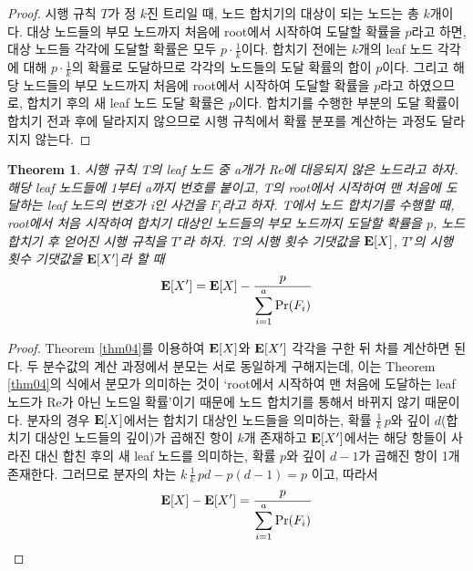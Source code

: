 \documentclass[11pt]{article}
\newtheorem{theorem}{Theorem}
\begin{document}
\begin{proof}
시행 규칙 $T$가 정 $k$진 트리일 때, 노드 합치기의 대상이 되는 노드는 총 $k$개이다. 대상 노드들의 부모 노드까지 처음에 root에서 시작하여 도달할 확률을 $p$라고 하면, 대상 노드들 각각에 도달할 확률은 모두 $p\cdot\frac{1}{k}$이다. 합치기 전에는 $k$개의 leaf 노드 각각에 대해 $p\cdot\frac{1}{k}$의 확률로 도달하므로 각각의 노드들의 도달 확률의 합이 $p$이다. 그리고 해당 노드들의 부모 노드까지 처음에 root에서 시작하여 도달할 확률을 $p$라고 하였으므로, 합치기 후의 새 leaf 노드 도달 확률은 $p$이다. 합치기를 수행한 부분의 도달 확률이 합치기 전과 후에 달라지지 않으므로 시행 규칙에서 확률 분포를 계산하는 과정도 달라지지 않는다.
\end{proof}

\singlespacing
\begin{theorem}
시행 규칙 T의 leaf 노드 중 a개가 Re에 대응되지 않은 노드라고 하자. 해당 leaf 노드들에 1부터 a까지 번호를 붙이고, T의 root에서 시작하여 맨 처음에 도달하는 leaf 노드의 번호가 i인 사건을 $F_{i}$라고 하자. T에서 노드 합치기를 수행할 때, root에서 처음 시작하여 합치기 대상인 노드들의 부모 노드까지 도달할 확률을 $p$, 노드 합치기 후 얻어진 시행 규칙을 $T'$라 하자. T의 시행 횟수 기댓값을 $\textnormal{\textbf{E}}[X]$, $T'$의 시행 횟수 기댓값을 $\textnormal{\textbf{E}}[X']$라 할 때
\[\textnormal{\textbf{E}}[X'] = \textnormal{\textbf{E}}[X] - \frac{p}{\displaystyle \sum_{i=1}^{a} \textnormal{Pr}(F_{i})}\]
\label{thm06}
\end{theorem}
\doublespacing

\begin{proof}
Theorem \ref{thm04}를 이용하여 $\textnormal{\textbf{E}}[X]$와 $\textnormal{\textbf{E}}[X']$ 각각을 구한 뒤 차를 계산하면 된다. 두 분수값의 계산 과정에서 분모는 서로 동일하게 구해지는데, 이는 Theorem \ref{thm04}의 식에서 분모가 의미하는 것이 `root에서 시작하여 맨 처음에 도달하는 leaf 노드가 Re가 아닌 노드일 확률'이기 때문에 노드 합치기를 통해서 바뀌지 않기 때문이다. 분자의 경우 $\textnormal{\textbf{E}}[X]$에서는 합치기 대상인 노드들을 의미하는, 확률 $\displaystyle \frac{1}{k}\,p$와 깊이 $d$(합치기 대상인 노드들의 깊이)가 곱해진 항이 $k$개 존재하고 $\textnormal{\textbf{E}}[X']$에서는 해당 항들이 사라진 대신 합친 후의 새 leaf 노드를 의미하는, 확률 $p$와 깊이 $d-1$가 곱해진 항이 1개 존재한다. 그러므로 분자의 차는 $k\,\displaystyle \frac{1}{k}\,pd - p(d-1) = p$ 이고, 따라서
\[\textnormal{\textbf{E}}[X] - \textnormal{\textbf{E}}[X'] = \frac{p}{\displaystyle \sum_{i=1}^{a} \textnormal{Pr}(F_{i})}\]
\end{proof}
\end{document}

